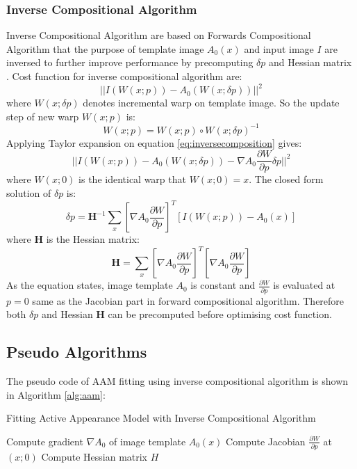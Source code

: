 \subsubsection{Inverse Compositional Algorithm}
Inverse Compositional Algorithm are based on Forwards Compositional Algorithm that the purpose of template image $A_0(x)$ and input image $I$ are inversed to further improve performance by precomputing $\delta p$ and Hessian matrix \cite{Matthews2004}. Cost function for inverse compositional algorithm are:
\begin{equation}
\label{eq:inversecomposition}
||I(W(x;p))-A_0(W(x;\delta p))||^2
\end{equation}
where $W(x;\delta p)$ denotes incremental warp on template image. So the update step of new warp $W(x;p)$ is:
\begin{equation}
W(x;p) = W(x;p)\circ W(x;\delta p)^{-1}
\end{equation}
Applying Taylor expansion on equation \ref{eq:inversecomposition} gives:
\begin{equation}
\label{eq:forwardcompositiontaylor}
||I(W(x;p))-A_0(W(x;\delta p))-\nabla A_0\frac{\partial W}{\partial p}\delta p||^2
\end{equation}
where $W(x;0)$ is the identical warp that $W(x;0) = x$. The closed form solution of $\delta p$ is:
\begin{equation}
\label{eq:dpic}
\delta p=\bm{H}^{-1}\sum_x[\nabla A_0\frac{\partial W}{\partial p}]^T[I(W(x;p))-A_0(x)]
\end{equation}
where $\bm{H}$ is the Hessian matrix:
\begin{equation}
\label{eq:hessianic}
\bm{H}=\sum_x[\nabla A_0\frac{\partial W}{\partial p}]^T[\nabla A_0\frac{\partial W}{\partial p}]
\end{equation}
As the equation states, image template $A_0$ is constant and $\frac{\partial W}{\partial p}$ is evaluated at $p=0$ same as the Jacobian part in forward compositional algorithm. Therefore both $\delta p$ and Hessian $\bm{H}$ can be precomputed before optimising cost function. 

\subsection{Pseudo Algorithms}

The pseudo code of AAM fitting using inverse compositional algorithm is shown in Algorithm \ref{alg:aam}\cite{Matthews2004}:

\begin{algorithm}[h]
\caption{Fitting Active Appearance Model with Inverse Compositional Algorithm}
\label{alg:aam}
\DontPrintSemicolon
Compute gradient $\nabla A_0$ of image template $A_0(x)$\;
Compute Jacobian $\frac{\partial W}{\partial p}$ at $(x;0)$\;
Compute Hessian matrix $H$\;
\end{algorithm}


